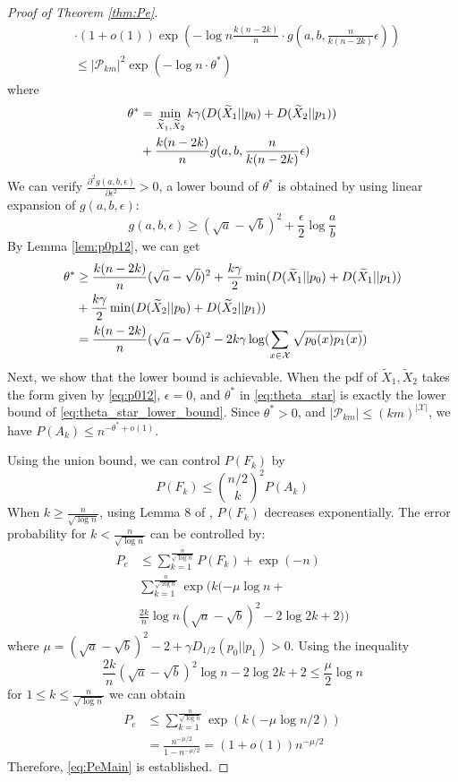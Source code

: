 \documentclass[conference]{IEEEtran}
\begin{document}
\begin{proof}[Proof of Theorem \ref{thm:Pe}]
\begin{align*}
& \cdot (1+o(1))\exp(-\log n \frac{k(n-2k)}{n}\cdot g(a, b, \frac{n}{k(n-2k)}\epsilon) ) \\
&\leq |\mathcal{P}_{km}|^2 \exp(-\log n \cdot \theta^*) 
\end{align*}
where
\begin{align}
\theta^* &= \min_{\widetilde{X}_1,\widetilde{X}_2} k\gamma (D(\widetilde{X}_1|| p_0) + D(\widetilde{X}_2 || p_1)) \notag \\
& + \frac{k(n-2k)}{n} g(a,b, \frac{n}{k(n-2k)}\epsilon) \label{eq:theta_star}
\end{align}
We can verify $\frac{\partial^2 g(a,b,\epsilon)}{\partial \epsilon^2} > 0$,
a lower bound of $\theta^*$ is obtained by using linear expansion of $g(a,b, \epsilon)$:
\begin{equation*}
g(a,b,\epsilon) \geq  (\sqrt{a} - \sqrt{b})^2 + \frac{\epsilon}{2}\log \frac{a}{b} 
\end{equation*}
By Lemma \ref{lem:p0p12}, we can get
{\scriptsize
\begin{align}
\theta^* &\geq \frac{k(n-2k)}{n}(\sqrt{a} - \sqrt{b})^2
+ \frac{k \gamma}{2}\min (D(\widetilde{X}_1||p_0) + D(\widetilde{X}_1||p_1)) \notag \\
&+ \frac{k \gamma}{2}\min (D(\widetilde{X}_2||p_0) + D(\widetilde{X}_2||p_1))\notag \\
&=  \frac{k(n-2k)}{n}(\sqrt{a} - \sqrt{b})^2 - 2 k\gamma\log(\sum_{x\in\mathcal{X}}\sqrt{p_0(x)p_1(x)}) 
\label{eq:theta_star_lower_bound}
\end{align}
}
Next, we show that the lower bound is achievable.
When the pdf of $\widetilde{X}_1, \widetilde{X}_2$ takes the form given by \eqref{eq:p012},
$\epsilon = 0$, and $\theta^*$ in \eqref{eq:theta_star} is exactly the lower bound of \eqref{eq:theta_star_lower_bound}.
Since $\theta^*>0$,
and $|\mathcal{P}_{km}|\leq (km)^{|\mathcal{X}|} $, we have $P(A_k) \leq n^{-\theta^*+o(1)}$.

Using the union bound, we can control $P(F_k)$ by
$$
P(F_k) \leq \binom{n/2}{k}^2 P(A_k)
$$
When $k \geq \frac{n}{\sqrt{\log n}}$, using Lemma 8 of \cite{feng2021},
$P(F_k)$ decreases exponentially. The error probability for $k < \frac{n}{\sqrt{\log n}}$
can be controlled by:
\begin{align*}
P_e &\leq \sum_{k=1}^{\frac{n}{\sqrt{\log n}}} P(F_k) + \exp(-n) \\
& \sum_{k=1}^{\frac{n}{\sqrt{\log n}}} \exp(k(-\mu \log n + \\
&\frac{2k}{n} \log n(\sqrt{a} - \sqrt{b})^2 - 2\log 2k + 2))
\end{align*}
where $\mu = (\sqrt{a} - \sqrt{b})^2-2 + \gamma D_{1/2}(p_0||p_1) > 0$.
Using the inequality
$$
\frac{2k}{n}(\sqrt{a} - \sqrt{b})^2\log n -2\log2k+2\leq \frac{\mu}{2} \log n
$$
for $1\leq k \leq \frac{n}{\sqrt{\log n}}$ we can obtain
\begin{align*}
P_e &\leq \sum_{k=1}^{\frac{n}{\sqrt{\log n}}} \exp(k(-\mu \log n/2)) \\
& = \frac{n^{-\mu / 2}}{1-n^{-\mu / 2}} = (1+o(1))n^{-\mu / 2}
\end{align*}
Therefore, \eqref{eq:PeMain} is established.
\end{proof}
\end{document}
